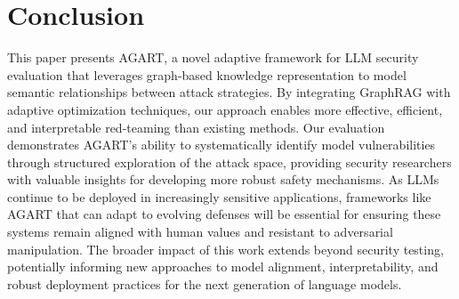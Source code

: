 \section{Conclusion}
This paper presents AGART, a novel adaptive framework for LLM security evaluation that leverages graph-based knowledge representation to model semantic relationships between attack strategies. By integrating GraphRAG with adaptive optimization techniques, our approach enables more effective, efficient, and interpretable red-teaming than existing methods. Our evaluation demonstrates AGART's ability to systematically identify model vulnerabilities through structured exploration of the attack space, providing security researchers with valuable insights for developing more robust safety mechanisms. As LLMs continue to be deployed in increasingly sensitive applications, frameworks like AGART that can adapt to evolving defenses will be essential for ensuring these systems remain aligned with human values and resistant to adversarial manipulation. The broader impact of this work extends beyond security testing, potentially informing new approaches to model alignment, interpretability, and robust deployment practices for the next generation of language models. 